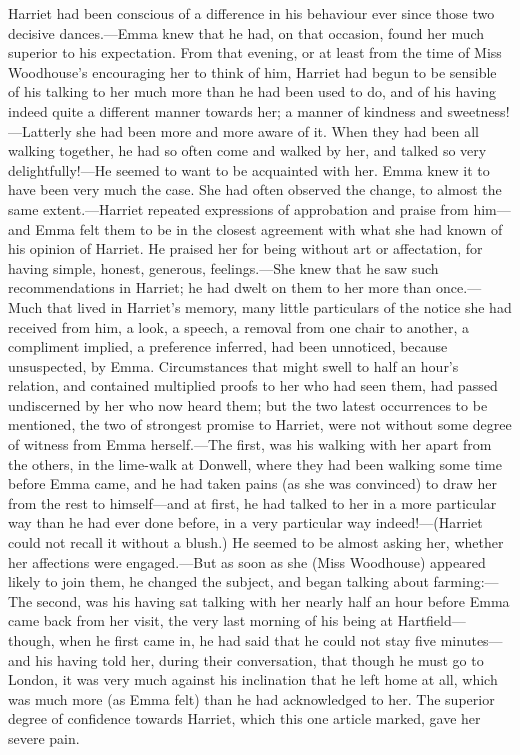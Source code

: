 Harriet had been conscious of a difference in his behaviour ever since those two decisive dances.—Emma knew that he had, on that occasion, found her much superior to his expectation. From that evening, or at least from the time of Miss Woodhouse's encouraging her to think of him, Harriet had begun to be sensible of his talking to her much more than he had been used to do, and of his having indeed quite a different manner towards her; a manner of kindness and sweetness!—Latterly she had been more and more aware of it. When they had been all walking together, he had so often come and walked by her, and talked so very delightfully!—He seemed to want to be acquainted with her. Emma knew it to have been very much the case. She had often observed the change, to almost the same extent.—Harriet repeated expressions of approbation and praise from him—and Emma felt them to be in the closest agreement with what she had known of his opinion of Harriet. He praised her for being without art or affectation, for having simple, honest, generous, feelings.—She knew that he saw such recommendations in Harriet; he had dwelt on them to her more than once.—Much that lived in Harriet's memory, many little particulars of the notice she had received from him, a look, a speech, a removal from one chair to another, a compliment implied, a preference inferred, had been unnoticed, because unsuspected, by Emma. Circumstances that might swell to half an hour's relation, and contained multiplied proofs to her who had seen them, had passed undiscerned by her who now heard them; but the two latest occurrences to be mentioned, the two of strongest promise to Harriet, were not without some degree of witness from Emma herself.—The first, was his walking with her apart from the others, in the lime-walk at Donwell, where they had been walking some time before Emma came, and he had taken pains (as she was convinced) to draw her from the rest to himself—and at first, he had talked to her in a more particular way than he had ever done before, in a very particular way indeed!—(Harriet could not recall it without a blush.) He seemed to be almost asking her, whether her affections were engaged.—But as soon as she (Miss Woodhouse) appeared likely to join them, he changed the subject, and began talking about farming:—The second, was his having sat talking with her nearly half an hour before Emma came back from her visit, the very last morning of his being at Hartfield—though, when he first came in, he had said that he could not stay five minutes—and his having told her, during their conversation, that though he must go to London, it was very much against his inclination that he left home at all, which was much more (as Emma felt) than he had acknowledged to her. The superior degree of confidence towards Harriet, which this one article marked, gave her severe pain.

